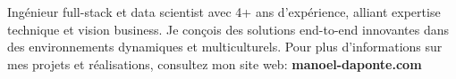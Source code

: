 


\begin{cvparagraph}
Ingénieur full-stack et data scientist avec 4+ ans d'expérience, alliant expertise technique et vision business. Je conçois des solutions end-to-end innovantes dans des environnements dynamiques et multiculturels. Pour plus d'informations sur mes projets et réalisations, consultez mon site web: \textbf{manoel-daponte.com}
\end{cvparagraph}